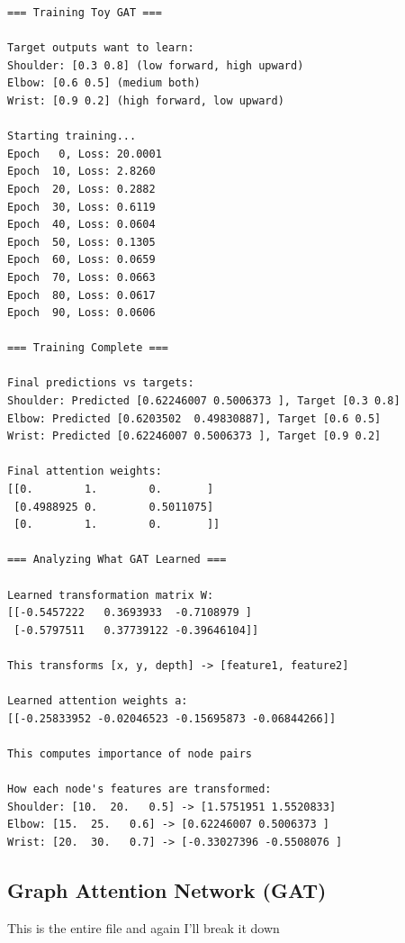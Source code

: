 \begin{lstlisting}[style=bashstyle,title={Toy GAT training output},label={code:toy_gat_trained_output}]
=== Training Toy GAT ===

Target outputs want to learn:
Shoulder: [0.3 0.8] (low forward, high upward)
Elbow: [0.6 0.5] (medium both)
Wrist: [0.9 0.2] (high forward, low upward)

Starting training...
Epoch   0, Loss: 20.0001
Epoch  10, Loss: 2.8260
Epoch  20, Loss: 0.2882
Epoch  30, Loss: 0.6119
Epoch  40, Loss: 0.0604
Epoch  50, Loss: 0.1305
Epoch  60, Loss: 0.0659
Epoch  70, Loss: 0.0663
Epoch  80, Loss: 0.0617
Epoch  90, Loss: 0.0606

=== Training Complete ===

Final predictions vs targets:
Shoulder: Predicted [0.62246007 0.5006373 ], Target [0.3 0.8]
Elbow: Predicted [0.6203502  0.49830887], Target [0.6 0.5]
Wrist: Predicted [0.62246007 0.5006373 ], Target [0.9 0.2]

Final attention weights:
[[0.        1.        0.       ]
 [0.4988925 0.        0.5011075]
 [0.        1.        0.       ]]

=== Analyzing What GAT Learned ===

Learned transformation matrix W:
[[-0.5457222   0.3693933  -0.7108979 ]
 [-0.5797511   0.37739122 -0.39646104]]

This transforms [x, y, depth] -> [feature1, feature2]

Learned attention weights a:
[[-0.25833952 -0.02046523 -0.15695873 -0.06844266]]

This computes importance of node pairs

How each node's features are transformed:
Shoulder: [10.  20.   0.5] -> [1.5751951 1.5520833]
Elbow: [15.  25.   0.6] -> [0.62246007 0.5006373 ]
Wrist: [20.  30.   0.7] -> [-0.33027396 -0.5508076 ]
\end{lstlisting}

\subsection{Graph Attention Network (GAT)}

This is the entire file and again I'll break it down

